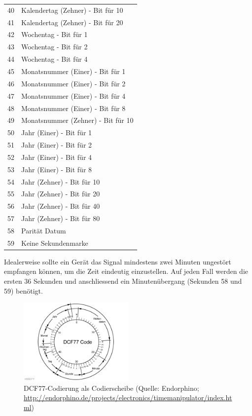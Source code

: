 \begin{longtable}{p{1cm} p{13cm}}
40 & Kalendertag (Zehner) - Bit für 10 \\
41 & Kalendertag (Zehner) - Bit für 20 \\
42 & Wochentag - Bit für 1 \\
43 & Wochentag - Bit für 2 \\
44 & Wochentag - Bit für 4 \\
45 & Monatsnummer (Einer) - Bit für 1 \\
46 & Monatsnummer (Einer) - Bit für 2 \\
47 & Monatsnummer (Einer) - Bit für 4 \\
48 & Monatsnummer (Einer) - Bit für 8 \\
49 & Monatsnummer (Zehner) - Bit für 10 \\
50 & Jahr (Einer) - Bit für 1 \\
51 & Jahr (Einer) - Bit für 2 \\
52 & Jahr (Einer) - Bit für 4 \\
53 & Jahr (Einer) - Bit für 8 \\
54 & Jahr (Zehner) - Bit für 10 \\
55 & Jahr (Zehner) - Bit für 20 \\
56 & Jahr (Zehner) - Bit für 40 \\
57 & Jahr (Zehner) - Bit für 80 \\
58 & Parität Datum \\
59 & Keine Sekundenmarke
\end{longtable}

Idealerweise sollte ein Gerät das Signal mindestens zwei Minuten ungestört empfangen können, um die Zeit eindeutig einzustellen. Auf jeden Fall werden die ersten 36 Sekunden und anschliessend ein Minutenübergang (Sekunden 58 und 59) benötigt.

\begin{figure}
  \centering
    \includegraphics[width=0.5\textwidth]{./images/Analyse/DCF77_Codierscheibe.png}
  \caption[DCF77-Codierung als Codierscheibe]{DCF77-Codierung als Codierscheibe (Quelle: Endorphino; 
  \url{http://endorphino.de/projects/electronics/timemanipulator/index.html})} 
\end{figure}

